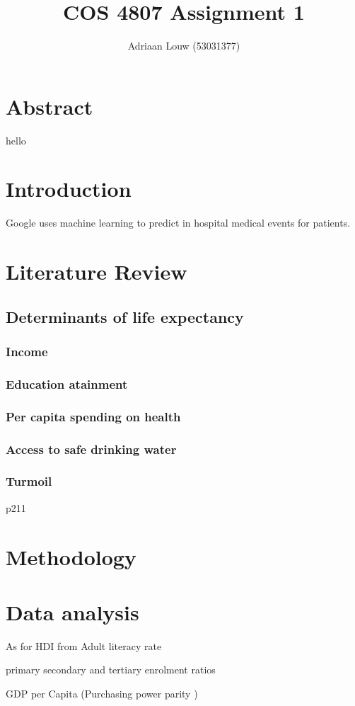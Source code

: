 \documentclass[10pt,a4paper]{article}
\title{COS 4807 Assignment 1}
\author{Adriaan Louw (53031377)}
\begin{document}
\maketitle

\tableofcontents

\listoffigures

\listoftables


\section{Abstract}
hello
\section{Introduction}

\cite{Rajkomar2018} Google uses machine learning to predict in hospital medical events for patients. 
\section{Literature Review}

\subsection{Determinants of life expectancy}

\subsubsection{Income}

\subsubsection{Education atainment}

\subsubsection{Per capita spending on health}

\subsubsection{Access to safe drinking water}

\subsubsection{Turmoil}
\citep{Low2008} p211

\section{Methodology}

\section{Data analysis}

As for HDI from \cite{Bulled2010}
Adult literacy rate

primary secondary and tertiary enrolment ratios

GDP per Capita (Purchasing power parity )



\end{document}
